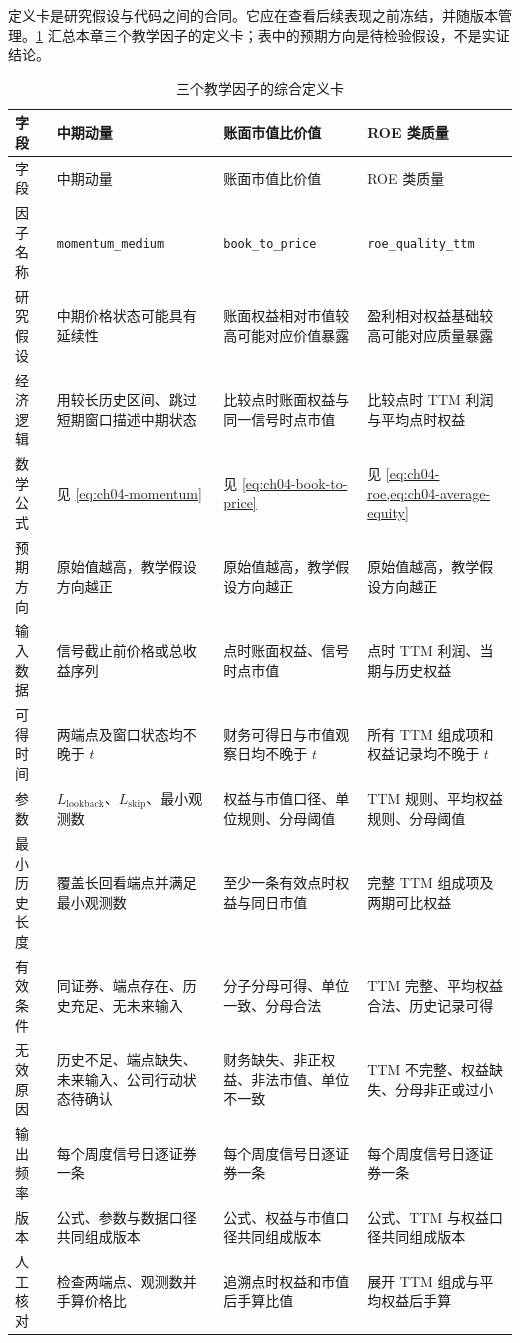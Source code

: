 定义卡是研究假设与代码之间的合同。它应在查看后续表现之前冻结，并随版本管理。\cref{tab:ch04-definition-cards} 汇总本章三个教学因子的定义卡；表中的预期方向是待检验假设，不是实证结论。

{
\setlength{\tabcolsep}{3pt}
\footnotesize
\begin{longtable}{p{2.05cm} p{4.1cm} p{4.1cm} p{4.1cm}}
\caption{三个教学因子的综合定义卡}\label{tab:ch04-definition-cards}\\
\toprule
字段 & 中期动量 & 账面市值比价值 & ROE 类质量 \\
\midrule
\endfirsthead
\toprule
字段 & 中期动量 & 账面市值比价值 & ROE 类质量 \\
\midrule
\endhead
因子名称 & \texttt{momentum\_medium} & \texttt{book\_to\_price} & \texttt{roe\_quality\_ttm} \\
研究假设 & 中期价格状态可能具有延续性 & 账面权益相对市值较高可能对应价值暴露 & 盈利相对权益基础较高可能对应质量暴露 \\
经济逻辑 & 用较长历史区间、跳过短期窗口描述中期状态 & 比较点时账面权益与同一信号时点市值 & 比较点时 TTM 利润与平均点时权益 \\
数学公式 & 见 \cref{eq:ch04-momentum} & 见 \cref{eq:ch04-book-to-price} & 见 \cref{eq:ch04-roe,eq:ch04-average-equity} \\
预期方向 & 原始值越高，教学假设方向越正 & 原始值越高，教学假设方向越正 & 原始值越高，教学假设方向越正 \\
输入数据 & 信号截止前价格或总收益序列 & 点时账面权益、信号时点市值 & 点时 TTM 利润、当期与历史权益 \\
可得时间 & 两端点及窗口状态均不晚于 \(t\) & 财务可得日与市值观察日均不晚于 \(t\) & 所有 TTM 组成项和权益记录均不晚于 \(t\) \\
参数 & \(L_{\mathrm{lookback}}\)、\(L_{\mathrm{skip}}\)、最小观测数 & 权益与市值口径、单位规则、分母阈值 & TTM 规则、平均权益规则、分母阈值 \\
最小历史长度 & 覆盖长回看端点并满足最小观测数 & 至少一条有效点时权益与同日市值 & 完整 TTM 组成项及两期可比权益 \\
有效条件 & 同证券、端点存在、历史充足、无未来输入 & 分子分母可得、单位一致、分母合法 & TTM 完整、平均权益合法、历史记录可得 \\
无效原因 & 历史不足、端点缺失、未来输入、公司行动状态待确认 & 财务缺失、非正权益、非法市值、单位不一致 & TTM 不完整、权益缺失、分母非正或过小 \\
输出频率 & 每个周度信号日逐证券一条 & 每个周度信号日逐证券一条 & 每个周度信号日逐证券一条 \\
版本 & 公式、参数与数据口径共同组成版本 & 公式、权益与市值口径共同组成版本 & 公式、TTM 与权益口径共同组成版本 \\
人工核对 & 检查两端点、观测数并手算价格比 & 追溯点时权益和市值后手算比值 & 展开 TTM 组成与平均权益后手算 \\
\bottomrule
\end{longtable}
}

